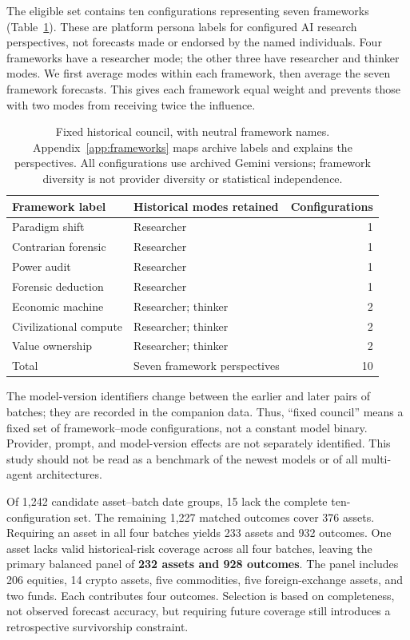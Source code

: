 \documentclass[11pt]{article}
\begin{document}
The eligible set contains ten configurations representing seven frameworks (Table~\ref{tab:frameworks}). These are platform persona labels for configured AI research perspectives, not forecasts made or endorsed by the named individuals. Four frameworks have a researcher mode; the other three have researcher and thinker modes. We first average modes within each framework, then average the seven framework forecasts. This gives each framework equal weight and prevents those with two modes from receiving twice the influence.

\begin{table}[H]
\centering\small
\begin{tabular}{llr}
\toprule
Framework label & Historical modes retained & Configurations\\
\midrule
Paradigm shift & Researcher & 1\\
Contrarian forensic & Researcher & 1\\
Power audit & Researcher & 1\\
Forensic deduction & Researcher & 1\\
Economic machine & Researcher; thinker & 2\\
Civilizational compute & Researcher; thinker & 2\\
Value ownership & Researcher; thinker & 2\\
\midrule
Total & Seven framework perspectives & 10\\
\bottomrule
\end{tabular}
\caption{Fixed historical council, with neutral framework names. Appendix~\ref{app:frameworks} maps archive labels and explains the perspectives. All configurations use archived Gemini versions; framework diversity is not provider diversity or statistical independence.}
\label{tab:frameworks}
\end{table}

The model-version identifiers change between the earlier and later pairs of batches; they are recorded in the companion data. Thus, ``fixed council'' means a fixed set of framework--mode configurations, not a constant model binary. Provider, prompt, and model-version effects are not separately identified. This study should not be read as a benchmark of the newest models or of all multi-agent architectures.

Of 1,242 candidate asset--batch date groups, 15 lack the complete ten-configuration set. The remaining 1,227 matched outcomes cover 376 assets. Requiring an asset in all four batches yields 233 assets and 932 outcomes. One asset lacks valid historical-risk coverage across all four batches, leaving the primary balanced panel of \textbf{232 assets and 928 outcomes}. The panel includes 206 equities, 14 crypto assets, five commodities, five foreign-exchange assets, and two funds. Each contributes four outcomes. Selection is based on completeness, not observed forecast accuracy, but requiring future coverage still introduces a retrospective survivorship constraint.
\end{document}
